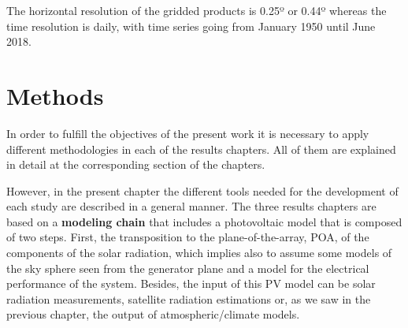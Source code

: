 The horizontal resolution of the gridded products is 0.25º or 0.44º whereas the time resolution is daily, with time series going from January 1950 until June 2018.  



\chapter{Methods\label{cha:methods}}

In order to fulfill the objectives of the present work it is necessary to apply different methodologies in each of the results chapters. All of them are explained in detail at the corresponding section of the chapters. %

However, in the present chapter the different tools needed for the development of each study are described in a general manner. The three results chapters are based on a \textbf{modeling chain} that includes a photovoltaic model that is composed of two steps. First, the transposition to the plane-of-the-array, POA, of the components of the solar radiation, which implies also to assume some models of the sky sphere seen from the generator plane and a model for the electrical performance of the system. Besides, the input of this PV model can be solar radiation measurements, satellite radiation estimations or, as we saw in the previous chapter, the output of atmospheric/climate models. 



